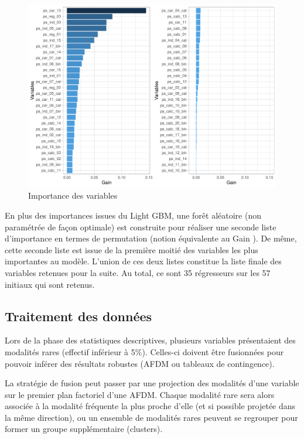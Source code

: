 \documentclass[french]{article}
\begin{document}
\begin{multicols}{2}
\begin{figure}[H] \centering
  \includegraphics[width = \columnwidth]{img/var_imp_lgb}
  \caption{Importance des variables}
\end{figure}


En plus des importances issues du Light GBM, une forêt aléatoire (non paramétrée de façon optimale) est construite pour réaliser une seconde liste d'importance en termes de \og permutation \fg{} (notion équivalente au \og Gain \fg{}). De même, cette seconde liste est issue de la première moitié des variables les plus importantes au modèle. L'union de ces deux listes constitue la liste finale des variables retenues pour la suite. Au total, ce sont 35 régresseurs sur les 57 initiaux qui sont retenus.


\subsection{Traitement des données}

Lors de la phase des statistiques descriptives, plusieurs variables présentaient des modalités rares (effectif inférieur à 5\%). Celles-ci doivent être fusionnées pour pouvoir inférer des résultats robustes (AFDM ou tableaux de contingence).

La stratégie de fusion peut passer par une projection des modalités d'une variable sur le premier plan factoriel d'une AFDM. Chaque modalité rare sera alors associée à la modalité fréquente la plus proche d'elle (et si possible projetée dans la même direction), ou un ensemble de modalités rares peuvent se regrouper pour former un groupe supplémentaire (clusters).


\end{multicols}
\end{document}
